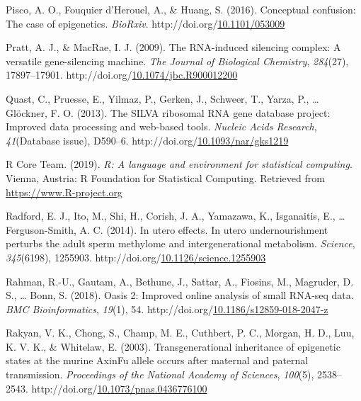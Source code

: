 \documentclass[12pt,twoside]{reedthesis}
\newlength{\cslhangindent}
\newenvironment{CSLReferences}[2] %
 {%
  \setlength{\parindent}{0pt}
  \ifodd #1 \everypar{\setlength{\hangindent}{\cslhangindent}}\ignorespaces\fi
  \ifnum #2 > 0
  \setlength{\parskip}{#2\baselineskip}
  \fi
 }%
 {}
\begin{document}
\begin{CSLReferences}{1}{0}
\leavevmode{}%
Pisco, A. O., Fouquier d'Herouel, A., \& Huang, S. (2016). Conceptual confusion: The case of epigenetics. \emph{BioRxiv}. http://doi.org/\href{https://doi.org/10.1101/053009}{10.1101/053009}

\leavevmode{}%
Pratt, A. J., \& MacRae, I. J. (2009). The RNA-induced silencing complex: A versatile gene-silencing machine. \emph{The Journal of Biological Chemistry}, \emph{284}(27), 17897--17901. http://doi.org/\href{https://doi.org/10.1074/jbc.R900012200}{10.1074/jbc.R900012200}

\leavevmode{}%
Quast, C., Pruesse, E., Yilmaz, P., Gerken, J., Schweer, T., Yarza, P., \ldots{} Glöckner, F. O. (2013). The SILVA ribosomal RNA gene database project: Improved data processing and web-based tools. \emph{Nucleic Acids Research}, \emph{41}(Database issue), D590--6. http://doi.org/\href{https://doi.org/10.1093/nar/gks1219}{10.1093/nar/gks1219}

\leavevmode{}%
R Core Team. (2019). \emph{R: A language and environment for statistical computing}. Vienna, Austria: R Foundation for Statistical Computing. Retrieved from \url{https://www.R-project.org}

\leavevmode{}%
Radford, E. J., Ito, M., Shi, H., Corish, J. A., Yamazawa, K., Isganaitis, E., \ldots{} Ferguson-Smith, A. C. (2014). In utero effects. In utero undernourishment perturbs the adult sperm methylome and intergenerational metabolism. \emph{Science}, \emph{345}(6198), 1255903. http://doi.org/\href{https://doi.org/10.1126/science.1255903}{10.1126/science.1255903}

\leavevmode{}%
Rahman, R.-U., Gautam, A., Bethune, J., Sattar, A., Fiosins, M., Magruder, D. S., \ldots{} Bonn, S. (2018). Oasis 2: Improved online analysis of small RNA-seq data. \emph{BMC Bioinformatics}, \emph{19}(1), 54. http://doi.org/\href{https://doi.org/10.1186/s12859-018-2047-z}{10.1186/s12859-018-2047-z}

\leavevmode{}%
Rakyan, V. K., Chong, S., Champ, M. E., Cuthbert, P. C., Morgan, H. D., Luu, K. V. K., \& Whitelaw, E. (2003). Transgenerational inheritance of epigenetic states at the murine AxinFu allele occurs after maternal and paternal transmission. \emph{Proceedings of the National Academy of Sciences}, \emph{100}(5), 2538--2543. http://doi.org/\href{https://doi.org/10.1073/pnas.0436776100}{10.1073/pnas.0436776100}


\end{CSLReferences}
\end{document}
